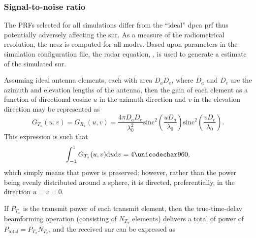 \subsubsection{Signal-to-noise ratio}
The PRFs selected for all simulations differ from the ``ideal'' \gls{dpca} \gls{prf} thus potentially adversely affecting the \gls{snr}. As a measure of the radiometrical resolution, the \gls{nesz} is computed for all modes. 
Based upon parameters in the simulation configuration file, the radar equation, \cite{Skolnik}, is used to generate a estimate of the simulated \gls{snr}. 
\par
Assuming ideal antenna elements, each with area $D_aD_e$, where $D_a$ and $D_e$ are the azimuth and elevation lengths of the antenna, then the gain of each element as a function of directional cosine $u$ in the azimuth direction and $v$ in the elevation direction may be represented as
\begin{equation}
 G_{T_x}(u,v) = G_{R_x}(u,v) = \frac{4\pi D_aD_e}{\lambda_0^2}\text{sinc}^2\left(\frac{uD_a}{\lambda_0}\right)\text{sinc}^2\left(\frac{vD_e}{\lambda_0}\right).
 \label{eq:gainPattern}
\end{equation}
This expression is such that
\begin{equation}
 \int_{-1}^1G_{T_x}(u,v)\d{u}\d{v}=4\pi,
\end{equation}
which simply means that power is preserved; however, rather than the power being evenly distributed around a sphere, it is directed, preferentially, in the direction $u=v=0$.
\par
If $P_{T_x}$ is the transmit power of each transmit element, then the true-time-delay beamforming operation (consisting of $N_{T_x}$ elements) delivers a total of power of $P_{\text{total}} = P_{T_x}N_{T_x}$, and the received \gls{snr} can be expressed as
